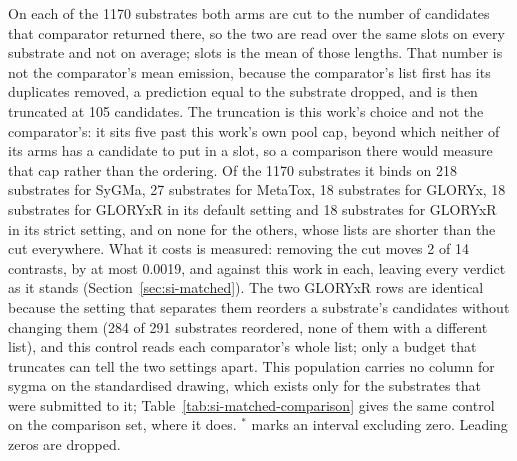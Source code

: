 \begin{table}[t]
\begin{threeparttable}
\begin{tablenotes}[flushleft]
\item On each of the 1170 substrates both arms are cut to the number of candidates that comparator returned there, so the two are read over the same slots on every substrate and not on average; slots is the mean of those lengths. That number is not the comparator's mean emission, because the comparator's list first has its duplicates removed, a prediction equal to the substrate dropped, and is then truncated at 105 candidates. The truncation is this work's choice and not the comparator's: it sits five past this work's own pool cap, beyond which neither of its arms has a candidate to put in a slot, so a comparison there would measure that cap rather than the ordering. Of the 1170 substrates it binds on 218 substrates for SyGMa, 27 substrates for MetaTox, 18 substrates for GLORYx, 18 substrates for GLORYxR in its default setting and 18 substrates for GLORYxR in its strict setting, and on none for the others, whose lists are shorter than the cut everywhere. What it costs is measured: removing the cut moves 2 of 14 contrasts, by at most 0.0019, and against this work in each, leaving every verdict as it stands (Section~\ref{sec:si-matched}). The two GLORYxR rows are identical because the setting that separates them reorders a substrate's candidates without changing them (284 of 291 substrates reordered, none of them with a different list), and this control reads each comparator's whole list; only a budget that truncates can tell the two settings apart. This population carries no column for sygma on the standardised drawing, which exists only for the substrates that were submitted to it; Table~\ref{tab:si-matched-comparison} gives the same control on the comparison set, where it does. $^{*}$ marks an interval excluding zero. Leading zeros are dropped.
\end{tablenotes}
\end{threeparttable}
\end{table}
